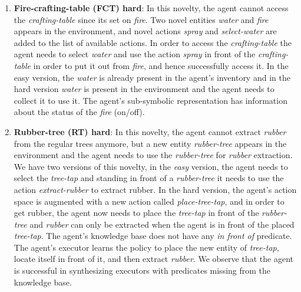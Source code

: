 {\begin{enumerate}[leftmargin=*]
    \item \textbf{Fire-crafting-table (FCT) hard}: In this novelty, the agent cannot access the \emph{crafting-table} since its set on \emph{fire}. Two novel entities \emph{water} and \emph{fire} appears in the environment, and novel actions \emph{spray} and \emph{select-water} are added to the list of available actions. In order to access the \emph{crafting-table} the agent needs to select \emph{water} and use the action \emph{spray} in front of the \emph{crafting-table} in order to put it out from \emph{fire}, and hence successfully access it. In the easy version, the \emph{water} is already present in the agent's inventory and in the hard version \emph{water} is present in the environment and the agent needs to collect it to use it.
    The agent's sub-symbolic representation has information about the status of the \emph{fire} (on/off). 
    \item \textbf{Rubber-tree (RT) hard}: In this novelty, the agent cannot extract \emph{rubber} from the regular trees anymore, but a new entity \emph{rubber-tree} appears in the environment and the agent needs to use the \emph{rubber-tree} for \emph{rubber} extraction.
    We have two versions of this novelty, in the \emph{easy} version, the agent needs to select the \emph{tree-tap} and standing in front of a \emph{rubber-tree} it needs to use the action \emph{extract-rubber} to extract rubber. In the hard version, the agent's action space is augmented with a new action called \emph{place-tree-tap}, and in order to get rubber, the agent now needs to place the \emph{tree-tap} in front of the \emph{rubber-tree} and \emph{rubber} can only be extracted when the agent is in front of the placed \emph{tree-tap}. The agent's knowledge base does not have any \emph{in front of} predicate. The agent's executor learns the policy to place the new entity of \emph{tree-tap}, locate itself in front of it, and then extract \emph{rubber}. We observe that the agent is successful in synthesizing executors with predicates missing from the knowledge base.
    

\end{enumerate}}
